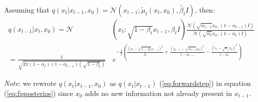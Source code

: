 \documentclass[twoside]{article}
\numberwithin{equation}{section}
\numberwithin{figure}{section}
\begin{document}
Assuming that $q\left(x_t | x_{t-1}, x_0\right) = \mathcal{N}\left(x_{t-1}; \tilde{\mu}_t \left(x_t, x_0\right), \tilde{\beta_t} I\right)$, then:
\begin{align}
  q\left(x_{t-1} | x_t, x_0\right) = \mathcal{N} & \left(x_t; \sqrt{1 - \beta_t}x_{t-1}, \beta_t I\right) \frac{\mathcal{N}\left(\sqrt{\bar{\alpha}_{t-1}} x_0, \left(1 - \bar{\alpha}_{t-1}\right)I\right)}{\mathcal{N}\left(\sqrt{\bar{\alpha}_t} x_0, \left(1 - \bar{\alpha}_t\right)I\right)} \label{eq:fpposterios} \\[15pt]
  = \frac{1}{\sqrt{2 \pi \left(1 - \bar{\alpha}_t\right) \left(1 - \bar{\alpha}_{t-1}\right) \left(\sqrt{1 - \beta_t}\right)}} & \, e^{- \frac{1}{2} \left(\frac{\left(x_t - \sqrt{1 - \beta_t}x_{t-1}\right)^2}{\beta_t} + \frac{\left(x_{t-1} - \sqrt{\bar{\alpha}_{t-1}}x_0\right)^2}{1 - \bar{\alpha}_{t-1}} - \frac{\left(x_t - \sqrt{\alpha}_t x_0\right)^2}{1 - \bar{\alpha}_{t}}\right)} \label{eq:bayeseq}
\end{align}

\textit{Note}: we rewrote $q\left(x_t | x_{t-1}, x_0\right)$ as $q\left(x_t | x_{t-1}\right)$ (\ref{eq:forwardstep}) in equation (\ref{eq:fpposterios}) since $x_0$ adds no new information not already present in $x_{t-1}$.
\end{document}
